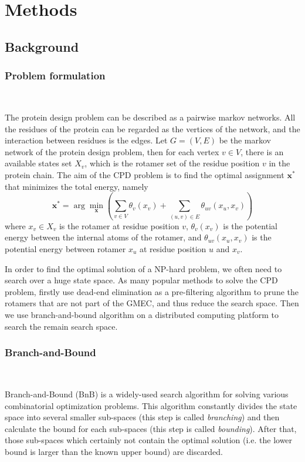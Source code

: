 \section{Methods}
\subsection{Background}

\subsubsection{Problem formulation}\ 

\noindent The protein design problem can be described as a pairwise markov networks. All the residues of the protein can be regarded as the vertices of the network, and the interaction between residues is the edges. Let $G=(V,E)$ be the markov network of the protein design problem, then for each vertex $v\in V$, there is an available states set $X_v$, which is the rotamer set of the residue position $v$ in the protein chain. The aim of the CPD problem is to find the optimal assignment $\mathbf{x^*}$ that minimizes the total energy, namely
\[ \mathbf{x^*} = \arg\min_{\mathbf{x}}\left(\sum_{v\in V}\theta_v(x_v) + \sum_{(u,v)\in E}\theta_{uv}(x_u,x_v)\right) \]
where $x_v\in X_v$ is the rotamer at residue position $v$, $\theta_v(x_v)$ is the potential energy between the internal atoms of the rotamer, and $\theta_{uv}(x_u,x_v)$ is the potential energy between rotamer $x_u$ at residue position $u$ and $x_v$.

In order to find the optimal solution of a NP-hard problem, we often need to search over a huge state space. As many popular methods to solve the CPD problem, firstly use dead-end elimination as a pre-filtering algorithm to prune the rotamers that are not part of the GMEC, and thus reduce the search space. Then we use branch-and-bound algorithm on a distributed computing platform to search the remain search space.

\subsubsection{Branch-and-Bound}\ 

\noindent Branch-and-Bound (BnB) is a widely-used search algorithm for solving various combinatorial optimization problems. This algorithm constantly divides the state space into several smaller sub-spaces (this step is called \textit{branching}) and then calculate the bound for each sub-spaces (this step is called \textit{bounding}). After that, those sub-spaces which certainly not contain the optimal solution (i.e. the lower bound is larger than the known upper bound) are discarded.

